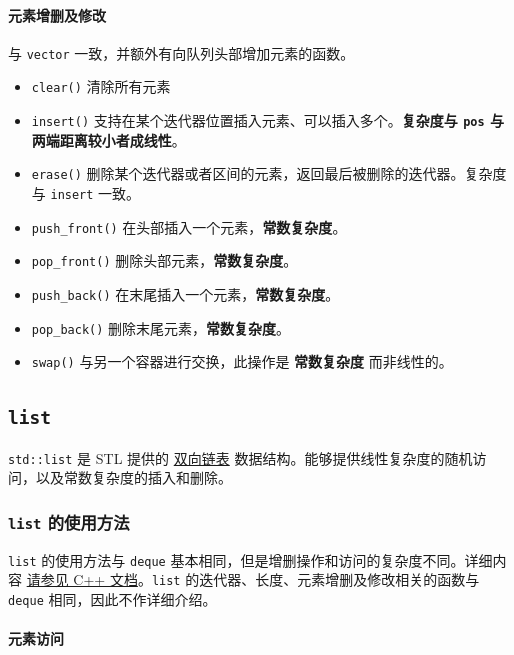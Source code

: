 \paragraph{元素增删及修改}\label{ux5143ux7d20ux589eux5220ux53caux4feeux6539-1}

与 \texttt{vector} 一致，并额外有向队列头部增加元素的函数。

\begin{itemize}
\tightlist
\item
  \texttt{clear()} 清除所有元素
\item
  \texttt{insert()} 支持在某个迭代器位置插入元素、可以插入多个。\textbf{复杂度与 \texttt{pos} 与两端距离较小者成线性}。
\item
  \texttt{erase()} 删除某个迭代器或者区间的元素，返回最后被删除的迭代器。复杂度与 \texttt{insert} 一致。
\item
  \texttt{push\_front()} 在头部插入一个元素，\textbf{常数复杂度}。
\item
  \texttt{pop\_front()} 删除头部元素，\textbf{常数复杂度}。
\item
  \texttt{push\_back()} 在末尾插入一个元素，\textbf{常数复杂度}。
\item
  \texttt{pop\_back()} 删除末尾元素，\textbf{常数复杂度}。
\item
  \texttt{swap()} 与另一个容器进行交换，此操作是 \textbf{常数复杂度} 而非线性的。
\end{itemize}

\subsection{\texorpdfstring{\texttt{list}}{list}}\label{list}

\texttt{std::list} 是 STL 提供的 \href{../../ds/linked-list.md}{双向链表} 数据结构。能够提供线性复杂度的随机访问，以及常数复杂度的插入和删除。

\subsubsection{\texorpdfstring{\texttt{list} 的使用方法}{list 的使用方法}}\label{list-ux7684ux4f7fux7528ux65b9ux6cd5}

\texttt{list} 的使用方法与 \texttt{deque} 基本相同，但是增删操作和访问的复杂度不同。详细内容 \href{https://zh.cppreference.com/w/cpp/container/list}{请参见 C++ 文档}。\texttt{list} 的迭代器、长度、元素增删及修改相关的函数与 \texttt{deque} 相同，因此不作详细介绍。

\paragraph{元素访问}\label{ux5143ux7d20ux8bbfux95ee-3}

